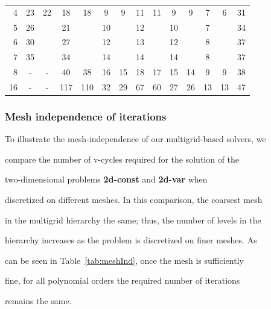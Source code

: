 \documentclass[smallcondensed,final]{svjour3}     %
\begin{document}
\begin{table}
\begin{tabular}{|r|c c|c c|c c||c c|c c|c c||c|}
4 & 23 & 22 & 18 & 18 & 9 & 9 & 11 & 11 & 9 & 9 & 7 & 6 & 31 \\

5 & 26 & & 21 & & 10 & & 12 & & 10 & & 7 & & 34  \\

6 & 30 & & 27 & & 12 & & 13 & & 12 & & 8 & & 37 \\

7 & 35 & & 34 & & 14 & & 14 & & 14 & & 8 & & 37  \\

8 & - & - & 40 & 38 & 16 & 15 & 18 & 17 & 15 & 14 & 9 & 9 & 38 \\

16 & - & - & 117 & 110 & 32 & 29 & 67 & 60 & 27 & 26 & 13 & 13 & 47\\

\hline

  \end{tabular}

\end{table}



\subsubsection{Mesh independence of iterations}\label{subsec:num_mesh}

To illustrate the mesh-independence of our multigrid-based solvers, we

compare the number of v-cycles required for the solution of the

two-dimensional problems {\bf 2d-const} and {\bf 2d-var} when

discretized on different meshes. In this comparison, the coarsest mesh

in the multigrid hierarchy the same; thus, the number of levels in the

hierarchy increases as the problem is discretized on finer meshes. As

can be seen in Table~\ref{tab:meshInd}, once the mesh is sufficiently

fine, for all polynomial orders the required number of iterations

remains the same.
\end{document}
